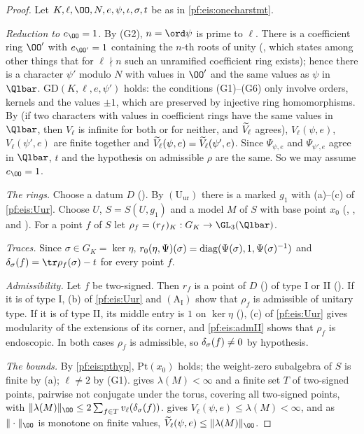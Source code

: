\begin{proof}
Let $K,\ell,\OO,N,e,\psi,\iota,\sigma,t$ be as in \cref{pf:eis:onecharstmt}.

\emph{Reduction to $e_\OO=1$.} By (G2), $n=\ord\psi$ is prime to $\ell$. There is a coefficient ring $\OO'$ with $e_{\OO'}=1$
containing the $n$-th roots of unity (, which states among other things that for $\ell\nmid n$
such an unramified coefficient ring exists); hence there is a character $\psi'$ modulo $N$ with values in $\OO'$ and the same values
as $\psi$ in $\Qlbar$. $\mathrm{GD}(K,\ell,e,\psi')$ holds: the conditions (G1)--(G6) only involve orders, kernels and the values $\pm1$,
which are preserved by injective ring homomorphisms. By  (if two characters with values in
coefficient rings have the same values in $\Qlbar$, then $V_\ell$ is infinite for both or for neither, and $\widetilde V_\ell$ agrees),
$V_\ell(\psi,e)$, $V_\ell(\psi',e)$ are finite together and $\widetilde V_\ell(\psi,e)=\widetilde V_\ell(\psi',e)$. Since $\Psi_{\psi,e}$ and
$\Psi_{\psi',e}$ agree in $\Qlbar$, $t$ and the hypothesis on admissible $\rho$ are the same. So we may assume $e_\OO=1$.

\emph{The rings.} Choose a datum $D$ (). By $(\mathrm{U}_{\mathrm{ur}})$ there is a marked
$g_1$ with (a)--(c) of \cref{pf:eis:Uur}. Choose $U$, $S=S(U,g_1)$ and a model $M$ of $S$ with base point $x_0$
(, , and ). For a point $f$ of
$S$ let $\rho_f=(r_f)_K:G_K\to\GL_3(\Qlbar)$.

\emph{Traces.} Since $\sigma\in G_K=\ker\eta$, $r_0(\eta,\Psi)(\sigma)=\mathrm{diag}(\Psi(\sigma),1,\Psi(\sigma)^{-1})$ and
$\eistr_\sigma(f)=\tr\rho_f(\sigma)-t$ for every point $f$.

\emph{Admissibility.} Let $f$ be two-signed. Then $r_f$ is a point of $D$ () of type I or II
(). If it is of type I, (b) of \cref{pf:eis:Uur} and $(\mathrm{A}_{\mathrm{I}})$ show that $\rho_f$ is
admissible of unitary type. If it is of type II, its middle entry is $1$ on $\ker\eta$ (),
(c) of \cref{pf:eis:Uur} gives modularity of the extensions of its corner, and \cref{pf:eis:admII} shows that $\rho_f$ is endoscopic.
In both cases $\rho_f$ is admissible, so $\delta_\sigma(f)\ne0$ by hypothesis.

\emph{The bounds.} By \cref{pf:eis:pthyp}, $\mathrm{Pt}(x_0)$ holds; the weight-zero subalgebra of $S$ is finite by (a); $\ell\ne2$ by
(G1).  gives $\lambda(M)<\infty$ and a finite set $T$ of two-signed points, pairwise not conjugate under the torus,
covering all two-signed points, with $\|\lambda(M)\|_\OO\le2\sum_{f\in T}\eisv(\eistr_\sigma(f))$.  gives
$V_\ell(\psi,e)\le\lambda(M)<\infty$, and as $\|\cdot\|_\OO$ is monotone on finite values,
$\eisVt_\ell(\psi,e)\le\|\lambda(M)\|_\OO$.


\end{proof}
